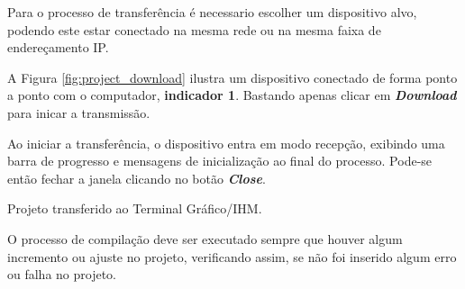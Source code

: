Para o processo de transferência 
é necessario escolher um dispositivo alvo, 
podendo este estar conectado na mesma rede 
ou na mesma faixa de endereçamento IP. 


A Figura \ref{fig:project_download} 
ilustra um dispositivo conectado 
de forma ponto a ponto com o computador,
\textbf{indicador 1}. 
Bastando apenas clicar em \textbf{\textit{Download}} 
para inicar a transmissão. 



\begin{figure}[ht!]
	\centering
\end{figure}



Ao iniciar a transferência, 
o dispositivo entra em modo recepção, 
exibindo uma barra de progresso e 
mensagens de inicialização ao final do processo. 
Pode-se então fechar a janela clicando no botão 
\textbf{\textit{Close}}.

Projeto transferido ao Terminal Gráfico/IHM. 

O processo de compilação deve ser executado sempre que houver algum incremento ou ajuste no projeto, verificando assim, se não foi inserido algum erro ou falha no projeto.


